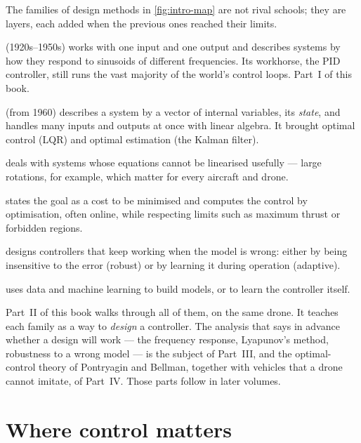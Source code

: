The families of design methods in \cref{fig:intro-map} are not rival schools; they are layers, each added when the previous ones reached their limits.
\begin{description}[leftmargin=0pt, itemsep=3pt, font=\sffamily\small\bfseries]
  \item[Classical control] (1920s–1950s) works with one input and one output and describes systems by how they respond to sinusoids of different frequencies. Its workhorse, the PID controller, still runs the vast majority of the world's control loops. Part~I of this book.
  \item[State-space control] (from 1960) describes a system by a vector of internal variables, its \emph{state}, and handles many inputs and outputs at once with linear algebra. It brought optimal control (LQR) and optimal estimation (the Kalman filter).
  \item[Nonlinear and geometric control] deals with systems whose equations cannot be linearised usefully — large rotations, for example, which matter for every aircraft and drone.
  \item[Optimal and predictive control] states the goal as a cost to be minimised and computes the control by optimisation, often online, while respecting limits such as maximum thrust or forbidden regions.
  \item[Robust and adaptive control] designs controllers that keep working when the model is wrong: either by being insensitive to the error (robust) or by learning it during operation (adaptive).
  \item[Learning-based control] uses data and machine learning to build models, or to learn the controller itself.
\end{description}
Part~II of this book walks through all of them, on the same drone. It teaches each family as a way to \emph{design} a controller. The analysis that says in advance whether a design will work — the frequency response, Lyapunov's method, robustness to a wrong model — is the subject of Part~III, and the optimal-control theory of Pontryagin and Bellman, together with vehicles that a drone cannot imitate, of Part~IV. Those parts follow in later volumes.

\section{Where control matters}


